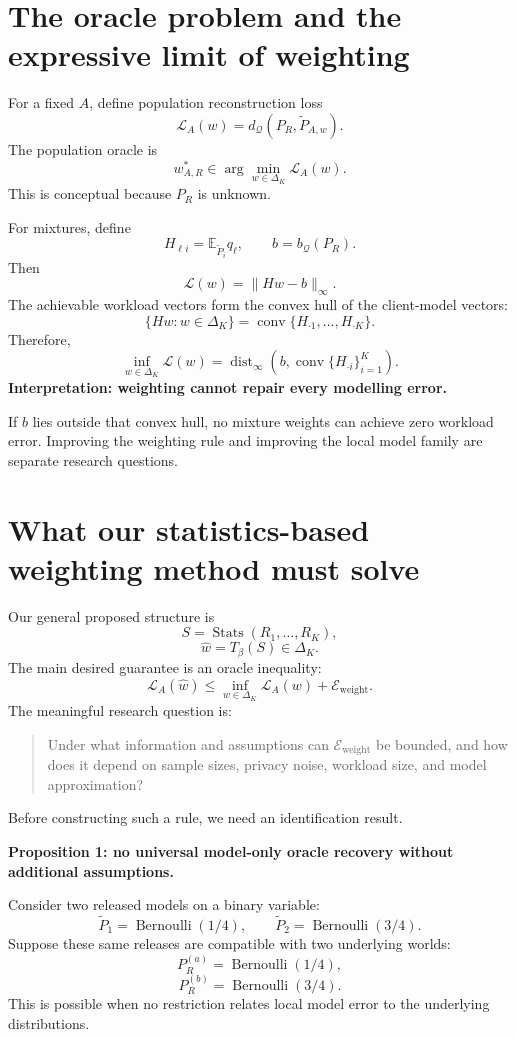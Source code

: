 \documentclass[11pt,a4paper]{article}
\begin{document}
\section{The oracle problem and the expressive limit of weighting}
For a fixed $A$, define population reconstruction loss
\[
\mathcal L_A(w)=d_{\mathcal Q}\left(P_R,\widetilde P_{A,w}\right).
\]
The population oracle is
\[
\boxed{w^*_{A,R}\in\arg\min_{w\in\Delta_K}\mathcal L_A(w).}
\]
This is conceptual because $P_R$ is unknown.

For mixtures, define
\[
H_{\ell i}=\mathbb E_{\widetilde P_i}q_\ell,\qquad b=b_{\mathcal Q}(P_R).
\]
Then
\[
\boxed{\mathcal L(w)=\|Hw-b\|_\infty.}
\]
The achievable workload vectors form the convex hull of the client-model vectors:
\[
\{Hw:w\in\Delta_K\}=\operatorname{conv}\{H_{\cdot1},\ldots,H_{\cdot K}\}.
\]
Therefore,
\[
\boxed{\inf_{w\in\Delta_K}\mathcal L(w)=
\operatorname{dist}_\infty\left(b,\operatorname{conv}\{H_{\cdot i}\}_{i=1}^{K}\right).}
\]
\textbf{Interpretation: weighting cannot repair every modelling error.}

If $b$ lies outside that convex hull, no mixture weights can achieve zero workload error. Improving the weighting rule and improving the local model family are separate research questions.

\section{What our statistics-based weighting method must solve}
Our general proposed structure is
\[
S=\operatorname{Stats}(R_1,\ldots,R_K),
\]
\[
\boxed{\widehat w=T_\beta(S)\in\Delta_K.}
\]
The main desired guarantee is an oracle inequality:
\[
\boxed{\mathcal L_A(\widehat w)\leq
\inf_{w\in\Delta_K}\mathcal L_A(w)+\mathcal E_{\mathrm{weight}}.}
\]
The meaningful research question is:
\begin{quote}
Under what information and assumptions can $\mathcal E_{\mathrm{weight}}$ be bounded, and how does it depend on sample sizes, privacy noise, workload size, and model approximation?
\end{quote}
Before constructing such a rule, we need an identification result.

\textbf{Proposition 1: no universal model-only oracle recovery without additional assumptions.}

Consider two released models on a binary variable:
\[
\widetilde P_1=\operatorname{Bernoulli}(1/4),\qquad
\widetilde P_2=\operatorname{Bernoulli}(3/4).
\]
Suppose these same releases are compatible with two underlying worlds:
\[
P_R^{(a)}=\operatorname{Bernoulli}(1/4),
\]
\[
P_R^{(b)}=\operatorname{Bernoulli}(3/4).
\]
This is possible when no restriction relates local model error to the underlying distributions.
\end{document}
